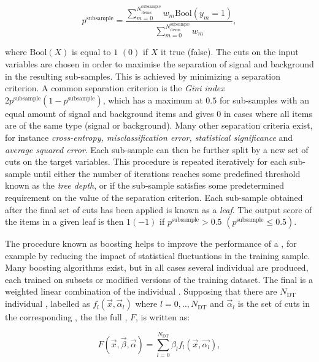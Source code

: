 \begin{equation}
 p^{\textrm{subsample}} = \frac{\sum_{m=0}^{N_{\textrm{items}}^{\textrm{subsample}}} w_{m} \textrm{Bool}(y_m=1)}{\sum_{m=0}^{N_{\textrm{items}}^{\textrm{subsample}}} w_{m}}, 
\end{equation}

where $\textrm{Bool}(X)$ is equal to $1$ $(0)$ if $X$ it true (false). 
The cuts on the input variables are chosen in order to maximise the separation of signal and background in the resulting sub-samples. This is achieved by minimizing a separation criterion. 
A common separation criterion is the \emph{Gini index} $2p^{\textrm{subsample}}(1-p^{\textrm{subsample}})$, which has a maximum at $0.5$ for sub-samples with an equal amount of signal and background items and gives $0$ in cases where all items are of the same type (signal or background). Many other separation criteria exist, for instance \emph{cross-entropy, misclassification error, statistical significance} and \emph{average squared error}.  
Each sub-sample can then be further split by a new set of cuts on the target variables. This procedure is repeated iteratively for each sub-sample until either the number of iterations reaches some predefined threshold known as the \emph{tree depth}, or if the sub-sample satisfies some predetermined requirement on the value of the separation criterion. Each sub-sample obtained after the final set of cuts has been applied is known as a \emph{leaf}. The output score of the items in a given leaf is then $1 (-1)$ if $p^{\textrm{subsample}}>0.5$ $(p^{\textrm{subsample}}\leq0.5)$.

The procedure known as boosting helps to improve the performance of a \DT, for example by reducing the impact of statistical fluctuations in the training sample. Many boosting algorithms exist, but in all cases several individual \DT\s are produced, each trained on subsets or modified versions of the training dataset. The final \BDT is a weighted linear combination of the individual \DT\s. Supposing that there are $N_{\textrm{DT}}$ individual \DT\s, labelled as $f_{l}(\vec{x},\vec{\alpha}_{l})$ where $l=0,..,N_{\textrm{DT}}$ and $\vec{\alpha}_{l}$ is the set of cuts in the corresponding \DT, the the full \BDT, $F$, is written as:

\begin{equation}
\label{reco:eq:bdt}
F(\vec{x},\vec{\beta},\vec{\alpha}) = \sum_{l=0}^{N_{\textrm{DT}}} \beta_{l} f_{l}(\vec{x},\vec{\alpha_{l}}), 
\end{equation}

